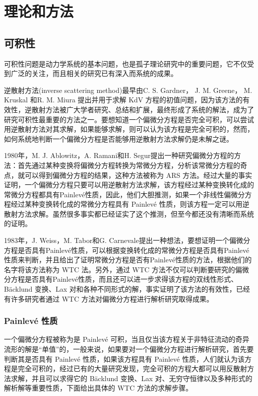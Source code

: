 
\chapter{理论和方法}
\section{可积性}
可积性问题是动力学系统的基本问题，也是孤子理论研究中的重要问题，它不仅受到广泛的关注，而且相关的研究已有深入而系统的成果。

逆散射方法(inverse scattering method)最早由C. S. Gardner， J. M. Greene， M. Kruskal 和R. M. Miura 提出并用于求解 KdV 方程的初值问题，因为该方法的有效性，逆散射方法被广大学者研究、总结和扩展，最终形成了系统的解法，成为了研究可积性最重要的方法之一。要想知道一个偏微分方程是否完全可积，可以尝试用逆散射方法对其求解，如果能够求解，则可以认为该方程是完全可积的，然而，如何系统地判断一个偏微分方程是否能够用逆散射方法求解仍是未解之谜。

1980年，M. J. Ablowitz，A. Ramani和H. Segur提出一种研究偏微分方程的方法：首先通过某种变换将偏微分方程转换为常微分方程，分析该常微分方程的奇点，就可以得到偏微分方程的结果，这种方法被称为 ARS 方法。经过大量的事实证明，一个偏微分方程只要可以用逆散射方法求解，该方程经过某种变换转化成的常微分方程都具有Painlev\'{e}性质，因此，他们大胆推测，如果一个非线性偏微分方程经过某种变换转化成的常微分方程具有 Painlev\'{e} 性质，则该方程一定可以用逆散射方法求解。虽然很多事实都已经证实了这个推测，但至今都还没有清晰而系统的证明。

1983年，J. Weiss，M. Tabor和G. Carnevale提出一种想法，要想证明一个偏微分方程是否具有Painlev\'{e}性质，可以根据变换转化成的常微分方程是否具有Painlev\'{e}性质来判断，并且给出了证明常微分方程是否有Painlev\'{e}性质的方法，根据他们的名字将该方法称为 WTC 法。另外，通过 WTC 方法不仅可以判断要研究的偏微分方程是否具有Painlev\'{e}性质，而且还可以进一步求得该方程的双线性形式、B\"{a}cklund 变换、Lax 对和各种不同形式的解，事实证明了该方法的有效性，已经有许多研究者通过 WTC 方法对偏微分方程进行解析研究取得成果。
\subsection{Painlev\'{e} 性质}
一个偏微分方程被称为是 Painlev\'{e} 可积，当且仅当该方程关于非特征流动的奇异流形的解是“单值”的，一般来说，如果要对一个偏微分方程进行解析研究，首先要判断其是否具有 Painlev\'{e} 性质，如果该方程具有 Painlev\'{e} 性质，人们就认为该方程是完全可积的，经过已有的大量研究发现，完全可积的方程大都可以用反散射方法求解，并且可以求得它的 B\"{a}cklund 变换、Lax 对、无穷守恒律以及多种形式的解析解等重要性质，下面给出具体的 WTC 方法的求解步骤。

